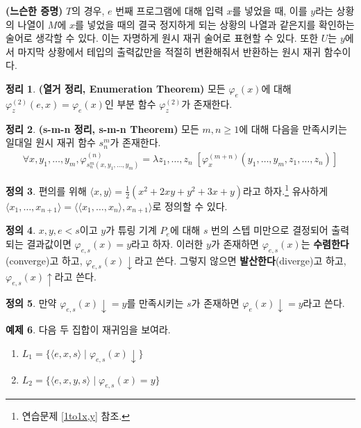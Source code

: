 \documentclass[b5paper, 11pt]{book}
\theoremstyle{definition}
\newtheorem{defn}{정의}[chapter]
\newtheorem{thm}[defn]{정리}
\newtheorem{ex}[defn]{예제}
\newenvironment{pf*}{\pushQED{\qed}\pf}
{\popQED\endpf}
\begin{document}
\begin{pf*}
    \textbf{(느슨한 증명)} $T$의 경우, $e$ 번째 프로그램에 대해 입력 $x$를 넣었을 때, 이를 $y$라는 상황의 나열이 $M$에 $x$를 넣었을 때의 결국 정지하게 되는 상황의 나열과 같은지를 확인하는 술어로 생각할 수 있다. 이는 자명하게 원시 재귀 술어로 표현할 수 있다. 또한 $U$는 $y$에서 마지막 상황에서 테입의 출력값만을 적절히 변환해줘서 반환하는 원시 재귀 함수이다.
\end{pf*}
\begin{thm}
    \textbf{(열거 정리, Enumeration Theorem)} 
    모든 $\varphi_e (x)$에 대해 $\varphi_z^{(2)} (e, x) = \varphi_e (x)$인 부분 함수 $\varphi_z^{(2)}$가 존재한다.
\end{thm}
\begin{thm}
    \textbf{(s-m-n 정리, s-m-n Theorem)} 모든 $m, n \ge 1$에 대해 다음을 만족시키는 일대일 원시 재귀 함수 $s_n^m$가 존재한다. 
    \begin{align*}
        \forall x, y_1, \ldots, y_m, \varphi^{(n)}_{s_n^m (x, y_1, \ldots, y_m)} = \lambda z_1, \ldots, z_n \; [\varphi_x^{(m+n)} (y_1, \ldots, y_m, z_1, \ldots, z_n)]
    \end{align*} 
\end{thm}
\begin{defn}
    편의를 위해 $\langle x, y \rangle =  \frac{1}{2}(x^2 + 2xy + y^2 + 3x + y)$라고 하자.\footnote{연습문제 \ref{1to1x,y} 참조.} 유사하게 $ \langle x_1, \ldots, x_{n+1} \rangle = \langle \langle x_1 , \ldots, x_n \rangle,  x_{n+1} \rangle$로 정의할 수 있다. 
\end{defn}
\begin{defn}
    $x, y, e < s$이고 $y$가 튜링 기계 $P_e$에 대해 $s$ 번의 스텝 미만으로 결정되어 출력되는 결과값이면 $\varphi_{e, s} (x) = y$라고 하자. 이러한 $y$가 존재하면 $\varphi_{e,s} (x)$는 \textbf{수렴한다}(converge)고 하고, $\varphi_{e, s} (x)\downarrow$라고 쓴다. 그렇지 않으면 \textbf{발산한다}(diverge)고 하고, $\varphi_{e, s} (x) \uparrow$라고 쓴다.
\end{defn}
\begin{defn}
    만약 $\varphi_{e, s} (x) \downarrow = y$를 만족시키는 $s$가 존재하면 $\varphi_e (x) \downarrow = y$라고 쓴다.
\end{defn}
\begin{ex}
    다음 두 집합이 재귀임을 보여라.
    \begin{enumerate}
        \item $L_1 = \{\langle e, x, s\rangle \;\vert\; \varphi_{e, s} (x) \downarrow \}$
        \item $L_2 = \{ \langle e, x, y, s \rangle \;\vert\; \varphi_{e, s} (x) = y\}$
    \end{enumerate}
\end{ex}
\end{document}
